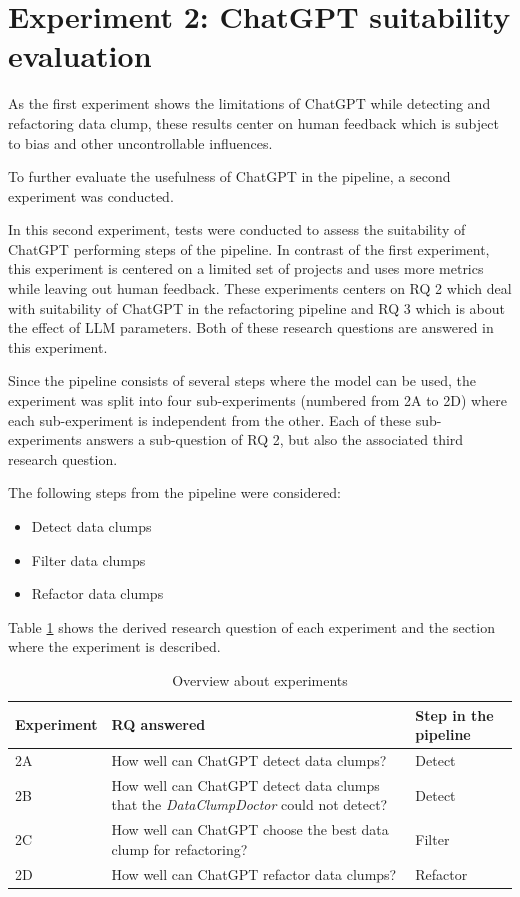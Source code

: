 
\newcommand{\dolphinscheduler}{\textit{DolphinScheduler}}
\newcommand{\rocketmq}{\textit{RocketMQ}}
\newcommand{\argouml}{\textit{ArgoUML}}

\section{Experiment 2: ChatGPT suitability evaluation}\label{sec:metric_based_eval}

As the first experiment shows the limitations of ChatGPT while detecting and refactoring data clump, these results center on human feedback which is subject to bias and other uncontrollable influences. 

To further evaluate the usefulness of ChatGPT in the pipeline, a second experiment was conducted.

In this second experiment, tests were conducted to assess the suitability of ChatGPT performing steps of the pipeline. In contrast of the first experiment, this experiment is centered on a limited set of projects and uses more metrics while leaving out human feedback. These experiments centers on RQ 2 which deal with suitability of ChatGPT in the refactoring pipeline and RQ 3 which is about the effect of \ac{LLM} parameters. Both of these research questions are answered in this experiment. 

Since the pipeline consists of several steps where the model can be used, the experiment was split into  four sub-experiments (numbered from 2A to 2D) where each sub-experiment is independent from the other. Each of these sub-experiments answers a sub-question of RQ 2, but also the associated third research question.

The following steps from the pipeline were considered:

\begin{itemize}
    \item Detect data clumps
    \item Filter data clumps
    \item Refactor data clumps
\end{itemize}

Table \ref{tbl:expB} shows the derived research question of each experiment and the section where the experiment is described. 
\begin{table}[ht!]
    \centering
    \begin{tabular}{m{2cm}|m{10cm}| m{2cm}}
      Experiment   & RQ answered & Step in the pipeline  \\\hline
        2A & How well can ChatGPT detect data clumps? & Detect  \\\hline
        2B & How well can ChatGPT detect data clumps that the \textit{DataClumpDoctor} could not detect? & Detect \\\hline
        2C & How well can ChatGPT choose the best data clump for refactoring? & Filter \\\hline
        2D & How well can ChatGPT  refactor data clumps? & Refactor \\\hline
    \end{tabular}
    \caption{Overview about experiments}
    \label{tbl:expB}
\end{table}

